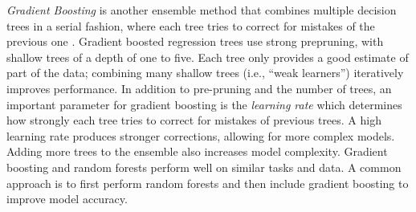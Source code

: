 \documentclass[sigconf]{acmart}
\begin{document}

\emph{Gradient Boosting} is another ensemble method that combines multiple 
decision trees in a serial fashion, where each tree tries to correct for 
mistakes of the previous one \cite{muller17}. Gradient boosted regression 
trees use strong prepruning, with shallow trees of a depth of one to five. 
Each tree only provides a good estimate of part of the data; combining many 
shallow trees (i.e., ``weak learners'') iteratively improves performance. 
In addition to pre-pruning and the number of trees, an important parameter 
for gradient boosting is the \emph{learning rate} which determines how 
strongly each tree tries to correct for mistakes of previous trees. A high 
learning rate produces stronger corrections, allowing for more complex models. 
Adding more trees to the ensemble also increases model complexity. Gradient 
boosting and random forests perform well on similar tasks and data. A common 
approach is to first perform random forests and then include gradient boosting 
to improve model accuracy. 




\end{document}
